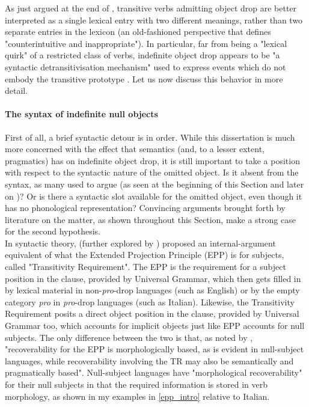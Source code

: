 As just argued at the end of , transitive verbs admitting object drop are better interpreted as a single lexical entry with two different meanings, rather than two separate entries in the lexicon (an old-fashioned perspective that \textcite[60]{Lorenzetti2008} defines "counterintuitive and inappropriate"). In particular, far from being a "lexical quirk" of a restricted class of verbs, indefinite object drop appears to be "a syntactic detransitivisation mechanism" used to express events which do not embody the transitive prototype \parencite[134]{Naess2007}. Let us now discuss this behavior in more detail.

\paragraph{The syntax of indefinite null objects} First of all, a brief syntactic detour is in order. While this dissertation is much more concerned with the effect that semantics (and, to a lesser extent, pragmatics) has on indefinite object drop, it is still important to take a position with respect to the syntactic nature of the omitted object. Is it absent from the syntax, as many used to argue (as seen at the beginning of this Section and later on )? Or is there a syntactic slot available for the omitted object, even though it has no phonological representation? Convincing arguments brought forth by literature on the matter, as shown throughout this Section, make a strong case for the second hypothesis.\\
In syntactic theory, \textcite{roberge2002transitivity} (further explored by \textcite{CumminsRoberge2004, CumminsRoberge2005}) proposed an internal-argument equivalent of what the Extended Projection Principle (EPP) \parencite{chomsky1982epp} is for subjects, called "Transitivity Requirement". The EPP is the requirement for a subject position in the clause, provided by Universal Grammar, which then gets filled in by lexical material in non-\textit{pro}-drop languages (such as English) or by the empty category \textit{pro} in \textit{pro}-drop languages (such as Italian). Likewise, the Transitivity Requirement posits a direct object position in the clause, provided by Universal Grammar too, which accounts for implicit objects just like EPP accounts for null subjects. The only difference between the two is that, as noted by \textcite{CumminsRoberge2004}, "recoverability for the EPP is morphologically based, as is evident in null-subject languages, while recoverability involving the TR may also be semantically and pragmatically based". Null-subject languages have "morphological recoverability" for their null subjects in that the required information is stored in verb morphology, as shown in my examples in \ref{epp_intro} relative to Italian.


